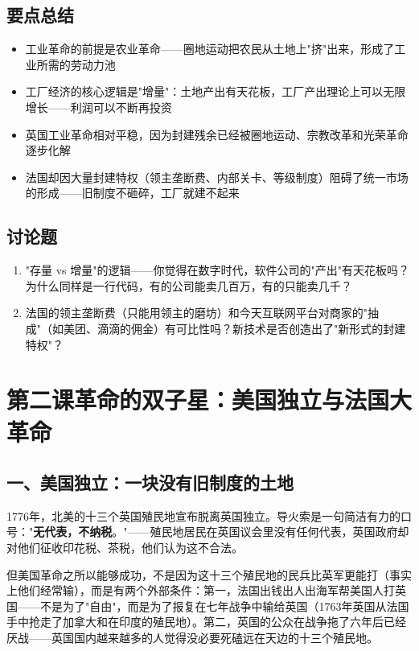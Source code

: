\documentclass[a4paper,12pt]{ctexart}
\begin{document}
\subsection*{要点总结}
\begin{itemize}
  \item 工业革命的前提是农业革命——圈地运动把农民从土地上"挤"出来，形成了工业所需的劳动力池
  \item 工厂经济的核心逻辑是"增量"：土地产出有天花板，工厂产出理论上可以无限增长——利润可以不断再投资
  \item 英国工业革命相对平稳，因为封建残余已经被圈地运动、宗教改革和光荣革命逐步化解
  \item 法国却因大量封建特权（领主垄断费、内部关卡、等级制度）阻碍了统一市场的形成——旧制度不砸碎，工厂就建不起来
\end{itemize}

\subsection*{讨论题}
\begin{enumerate}
  \item "存量 vs 增量"的逻辑——你觉得在数字时代，软件公司的"产出"有天花板吗？为什么同样是一行代码，有的公司能卖几百万，有的只能卖几千？
  \item 法国的领主垄断费（只能用领主的磨坊）和今天互联网平台对商家的"抽成"（如美团、滴滴的佣金）有可比性吗？新技术是否创造出了"新形式的封建特权"？
\end{enumerate}

\vspace{0.3cm}

\newpage

\section{\textcolor{orange!80!black}{第二课\quad 革命的双子星：美国独立与法国大革命}}

\subsection*{一、美国独立：一块没有旧制度的土地}

1776年，北美的十三个英国殖民地宣布脱离英国独立。导火索是一句简洁有力的口号："\textbf{无代表，不纳税}。"——殖民地居民在英国议会里没有任何代表，英国政府却对他们征收印花税、茶税，他们认为这不合法。

但美国革命之所以能够成功，不是因为这十三个殖民地的民兵比英军更能打（事实上他们经常输），而是有两个外部条件：第一，法国出钱出人出海军帮美国人打英国——不是为了"自由"，而是为了报复在七年战争中输给英国（1763年英国从法国手中抢走了加拿大和在印度的殖民地）。第二，英国的公众在战争拖了六年后已经厌战——英国国内越来越多的人觉得没必要死磕远在天边的十三个殖民地。
\end{document}
